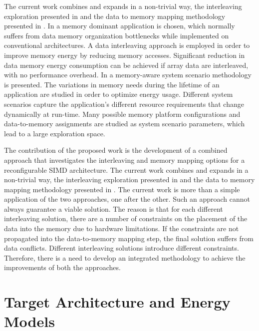 \documentclass[prodmode,acmtecs]{acmsmall}
\begin{document}
The current work combines and expands in a non-trivial way, the interleaving exploration presented in \cite{sharma2013data} and the data to memory mapping methodology presented in \cite{filippopoulos2013exploration}. 
In \cite{sharma2013data} a memory dominant application is chosen, which normally suffers from data memory organization bottlenecks while implemented on conventional architectures. 
A data interleaving approach is employed in order to improve memory energy by reducing memory accesses.
Significant reduction in data memory energy consumption can be achieved if array data are interleaved, with no performance overhead.
In \cite{filippopoulos2013exploration} a memory-aware system scenario methodology is presented.
The variations in memory needs during the lifetime of an application are studied in order to optimize energy usage.
Different system scenarios capture the application's different resource requirements that change dynamically at run-time.
Many possible memory platform configurations and data-to-memory assignments are studied as system scenario parameters, which lead to a large exploration space.

The contribution of the proposed work is the development of a combined approach that investigates the interleaving and memory mapping options for a reconfigurable SIMD architecture.  
The current work combines and expands in a non-trivial way, the interleaving exploration presented in \cite{sharma2013data} and the data to memory mapping methodology presented in \cite{filippopoulos2013exploration}. 
The current work is more than a simple application of the two approaches, one after the other.
Such an approach cannot always guarantee a viable solution.
The reason is that for each different interleaving solution, there are a number of constraints on the placement of the data into the memory due to hardware limitations.
If the constraints are not propagated into the data-to-memory mapping step, the final solution suffers from data conflicts.
Different interleaving solutions introduce different constraints. 
Therefore, there is a need to develop an integrated methodology to achieve the improvements of both the approaches.

\section{Target Architecture and Energy Models}
\label{sec:platform}
\end{document}
